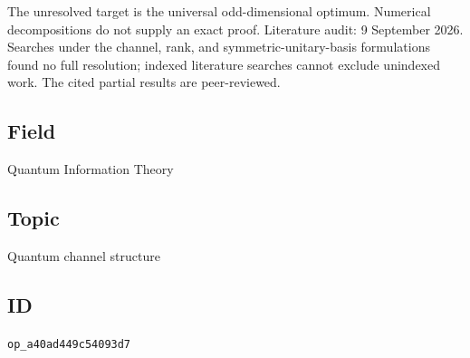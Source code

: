 The unresolved target is the universal odd-dimensional optimum.
Numerical decompositions do not supply an exact proof. Literature audit:
9 September 2026. Searches under the channel, rank, and symmetric-unitary-basis
formulations found no full resolution;
indexed literature searches cannot exclude unindexed work. The cited partial
results are peer-reviewed.

\subsection*{Field}

Quantum Information Theory

\subsection*{Topic}

Quantum channel structure

\subsection*{ID}

\texttt{op\_a40ad449c54093d7}
